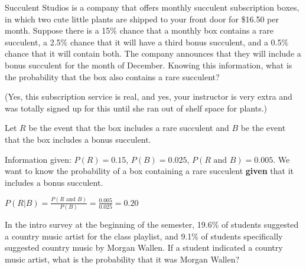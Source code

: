 \documentclass[noanswers]{exam}
\begin{document}
\begin{questions}
\begin{parts}
	
	\end{parts}
	
	\newpage 
	
	\question Succulent Studios is a company that offers monthly succulent subscription boxes, in which two cute little plants are shipped to your front door for \$16.50 per month. Suppose there is a 15\% chance that a monthly box contains a rare succulent, a 2.5\% chance that it will have a third bonus succulent, and a 0.5\% chance that it will contain both. The company announces that they will include a bonus succulent for the month of December. Knowing this information, what is the probability that the box also contains a rare succulent?
	
	\begin{solution}[\stretch{1}]
	
	\vspace{3mm}
	
	(Yes, this subscription service is real, and yes, your instructor is very extra and was totally signed up for this until she ran out of shelf space for plants.) 
	
	\vspace{3mm}
	
	Let $R$ be the event that the box includes a rare succulent and $B$ be the event that the box includes a bonus succulent.
	
	\vspace{3mm}
	
	Information given: $P(R)=0.15$, $P(B)=0.025$, $P(R\text{ and }B)=0.005$. We want to know the probability of a box containing a rare succulent \textbf{given} that it includes a bonus succulent.
	
	\vspace{3mm}
	
	$P(R|B)=\displaystyle\frac{P(R\text{ and }B)}{P(B)}=\frac{0.005}{0.025}=0.20$
	
	\vspace{3mm}
	
	\end{solution}
	
	\question In the intro survey at the beginning of the semester, 19.6\% of students suggested a country music artist for the class playlist, and 9.1\% of students specifically suggested country music by Morgan Wallen. If a student indicated a country music artist, what is the probability that it was Morgan Wallen?
	
	\begin{solution}[\stretch{1}]
	

\end{solution}
\end{questions}
\end{document}
